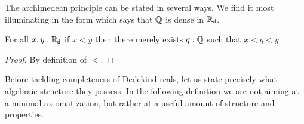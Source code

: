 The archimedean principle can be stated in several ways. We find it most illuminating in the
form which says that $\mathbb{Q}$ is dense in $\mathbb{R}_\mathsf{d}$.

\begin{thm} \label{RD-archimedean}
  For all $x, y : \mathbb{R}_\mathsf{d}$ if $x < y$ then there merely exists $q : \mathbb{Q}$ such that
  $x < q < y$.
\end{thm}

\begin{proof}
  By definition of $<$.
\end{proof}

Before tackling completeness of Dedekind reals, let us state precisely what algebraic
structure they possess. In the following definition we are not aiming at a minimal
axiomatization, but rather at a useful amount of structure and properties.

